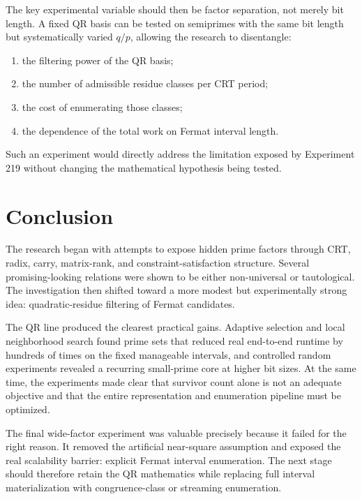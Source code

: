 \documentclass[11pt,a4paper]{article}
\begin{document}
The key experimental variable should then be factor separation, not merely bit length. A fixed QR basis can be tested on semiprimes with the same bit length but systematically varied $q/p$, allowing the research to disentangle:
\begin{enumerate}[leftmargin=2em]
\item the filtering power of the QR basis;
\item the number of admissible residue classes per CRT period;
\item the cost of enumerating those classes;
\item the dependence of the total work on Fermat interval length.
\end{enumerate}

Such an experiment would directly address the limitation exposed by Experiment 219 without changing the mathematical hypothesis being tested.

\section{Conclusion}

The research began with attempts to expose hidden prime factors through CRT, radix, carry, matrix-rank, and constraint-satisfaction structure. Several promising-looking relations were shown to be either non-universal or tautological. The investigation then shifted toward a more modest but experimentally strong idea: quadratic-residue filtering of Fermat candidates.

The QR line produced the clearest practical gains. Adaptive selection and local neighborhood search found prime sets that reduced real end-to-end runtime by hundreds of times on the fixed manageable intervals, and controlled random experiments revealed a recurring small-prime core at higher bit sizes. At the same time, the experiments made clear that survivor count alone is not an adequate objective and that the entire representation and enumeration pipeline must be optimized.

The final wide-factor experiment was valuable precisely because it failed for the right reason. It removed the artificial near-square assumption and exposed the real scalability barrier: explicit Fermat interval enumeration. The next stage should therefore retain the QR mathematics while replacing full interval materialization with congruence-class or streaming enumeration.
\end{document}
